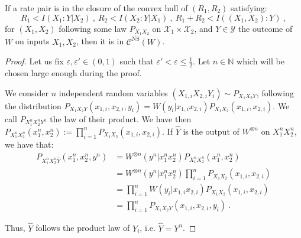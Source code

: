   \begin{proposition}      
      \label{prop:AchievabilityNSrelaxed}
      If a rate pair is in the closure of the convex hull of $(R_1,R_2)$ satisfying:
      \[ R_1 < I(X_1:Y|X_2)\ ,\ R_2 < I(X_2:Y|X_1)\ ,\ R_1+R_2 < I((X_1,X_2):Y) \ ,\]
      for $(X_1,X_2)$ following some law $P_{X_1X_2}$ on $\mathcal{X}_1 \times \mathcal{X}_2$, and $Y \in \mathcal{Y}$ the outcome of $W$ on inputs $X_1,X_2$, then it is in $\mathcal{C}^{\overline{\mathrm{NS}}}(W)$.
  \end{proposition}
  \begin{proof}
    Let us fix $\varepsilon,\varepsilon' \in (0,1)$ such that $\varepsilon' < \varepsilon \leq \frac{1}{2}$. Let $n \in \mathbb{N}$ which will be chosen large enough during the proof.

    We consider $n$ independent random variables $(X_{1,i}X_{2,i}Y_i) \sim P_{X_1X_2Y}$, following the distribution $P_{X_1X_2Y}(x_{1,i},x_{2,i},y_i) = W(y_i|x_{1,i}x_{2,i})P_{X_1X_2}(x_{1,i},x_{2,i})$. We call $P_{X_1^nX_2^nY^n} $ the law of their product. We have then $P_{X_1^nX_2^n}(x_1^n,x_2^n) := \prod_{i=1}^n P_{X_1X_2}(x_{1,i},x_{2,i})$. If $\hat{Y}$ is the output of $W^{\otimes n}$ on $X_1^nX_2^n$, we have that:
      \begin{equation}
        \begin{aligned}
          P_{X_1^nX_2^n\hat{Y}}(x_1^n,x_2^n,y^n) &= W^{\otimes n}(y^n|x_1^nx_2^n)P_{X_1^nX_2^n}(x_1^n,x_2^n)\\
          &= W^{\otimes n}(y^n|x_1^nx_2^n)\prod_{i=1}^n P_{X_1X_2}(x_{1,i},x_{2,i})\\
          &= \prod_{i=1}^n W(y_i|x_{1,i}x_{2,i})P_{X_1X_2}(x_{1,i},x_{2,i})\\
          &= \prod_{i=1}^n P_{X_1X_2Y}(x_{1,i},x_{2,i},y_i) \ .
        \end{aligned}
      \end{equation}

      Thus, $\hat{Y}$ follows the product law of $Y_i$, i.e.  $\hat{Y} = Y^n$.
      

\end{proof}
